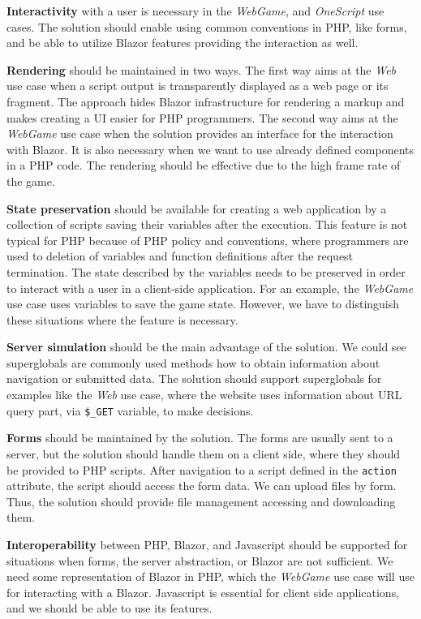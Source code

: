\par
\textbf{Interactivity} with a user is necessary in the \textit{WebGame}, and \textit{OneScript} use cases.
The solution should enable using common conventions in PHP, like forms, and be able to utilize Blazor features providing the interaction as well.
\par
\textbf{Rendering} should be maintained in two ways.
The first way aims at the \textit{Web} use case when a script output is transparently displayed as a web page or its fragment.
The approach hides Blazor infrastructure for rendering a markup and makes creating a UI easier for PHP programmers.
The second way aims at the \textit{WebGame} use case when the solution provides an interface for the interaction with Blazor.
It is also necessary when we want to use already defined components in a PHP code.
The rendering should be effective due to the high frame rate of the game.
\par
\textbf{State preservation} should be available for creating a web application by a collection of scripts saving their variables after the execution.
This feature is not typical for PHP because of PHP policy and conventions, where programmers are used to deletion of variables and function definitions after the request termination.
The state described by the variables needs to be preserved in order to interact with a user in a client-side application. 
For an example, the \textit{WebGame} use case uses variables to save the game state. 
However, we have to distinguish these situations where the feature is necessary.
\par
\textbf{Server simulation} should be the main advantage of the solution.
We could see superglobals are commonly used methods how to obtain information about navigation or submitted data.
The solution should support superglobals for examples like the \textit{Web} use case, where the website uses information about URL query part, via \texttt{\$\_GET} variable, to make decisions.
\par
\textbf{Forms} should be maintained by the solution. 
The forms are usually sent to a server, but the solution should handle them on a client side, where they should be provided to PHP scripts.
After navigation to a script defined in the \texttt{action} attribute, the script should access the form data.
We can upload files by form.
Thus, the solution should provide file management accessing and downloading them.
\par
\textbf{Interoperability} between PHP, Blazor, and Javascript should be supported for situations when forms, the server abstraction, or Blazor are not sufficient.
We need some representation of Blazor in PHP, which the \textit{WebGame} use case will use for interacting with a Blazor.
Javascript is essential for client side applications, and we should be able to use its features.

